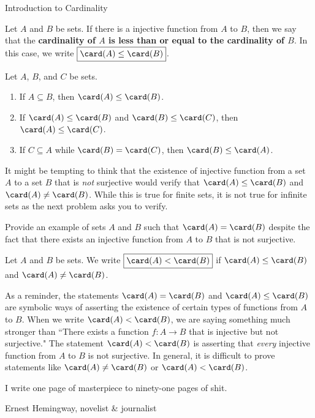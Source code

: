 \begin{section}{Introduction to Cardinality}
\begin{definition}
Let $A$ and $B$ be sets. If there is a injective function from $A$ to $B$, then we say that the \textbf{cardinality of $A$ is less than or equal to the cardinality of $B$}. In this case, we write $\boxed{\card(A)\leq\card(B)}$.
\end{definition}

\begin{theorem}
Let $A$, $B$, and $C$ be sets.
\begin{enumerate}[label=\textrm{(\alph*)}]
\item If $A\subseteq B$, then $\card(A)\leq \card(B)$.
\item If $\card(A)\leq \card(B)$ and $\card(B)\leq \card(C)$, then $\card(A)\leq \card(C)$.
\item If $C\subseteq A$ while $\card(B)=\card(C)$, then $\card(B)\leq \card(A)$.
\end{enumerate}
\end{theorem}

It might be tempting to think that the existence of injective function from a set $A$ to a set $B$ that is \emph{not} surjective would verify that $\card(A)\leq \card(B)$ and $\card(A)\neq \card(B)$. While this is true for finite sets, it is not true for infinite sets as the next problem asks you to verify.

\begin{problem}
Provide an example of sets $A$ and $B$ such that $\card(A)=\card(B)$ despite the fact that there exists an injective function from $A$ to $B$ that is not surjective.
\end{problem}

\begin{definition}
Let $A$ and $B$ be sets. We write $\boxed{\card(A)< \card(B)}$ if $\card(A)\leq \card(B)$ and $\card(A)\neq \card(B)$.
\end{definition}

As a reminder, the statements $\card(A)= \card(B)$ and $\card(A)\leq \card(B)$ are symbolic ways of asserting the existence of certain types of functions from $A$ to $B$. When we write $\card(A)<\card(B)$, we are saying something much stronger than ``There exists a function $f:A\to B$ that is injective but not surjective." The statement $\card(A)<\card(B)$ is asserting that \emph{every} injective function from $A$ to $B$ is not surjective. In general, it is difficult to prove statements like $\card(A)\neq \card(B)$ or $\card(A)<\card(B)$.

\epigraph{I write one page of masterpiece to ninety-one pages of shit.}{Ernest Hemingway, novelist \& journalist}

\end{section}